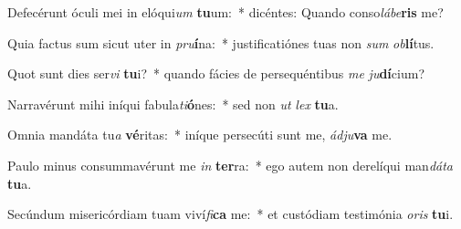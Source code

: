 \item Defecérunt óculi mei in elóqui\textit{um} \textbf{tu}um:~* dicéntes: Quando conso\textit{lá}\textit{be}\textbf{ris} me?
\item Quia factus sum sicut uter in \textit{pru}\textbf{í}na:~* justificatiónes tuas non \textit{sum} \textit{ob}\textbf{lí}tus.
\item Quot sunt dies ser\textit{vi} \textbf{tu}i?~* quando fácies de persequéntibus \textit{me} \textit{ju}\textbf{dí}cium?
\item Narravérunt mihi iníqui fabula\textit{ti}\textbf{ó}nes:~* sed non \textit{ut} \textit{lex} \textbf{tu}a.
\item Omnia mandáta tu\textit{a} \textbf{vé}ritas:~* iníque persecúti sunt me, \textit{ád}\textit{ju}\textbf{va} me.
\item Paulo minus consummavérunt me \textit{in} \textbf{ter}ra:~* ego autem non derelíqui man\textit{dá}\textit{ta} \textbf{tu}a.
\item Secúndum misericórdiam tuam viví\textit{fi}\textbf{ca} me:~* et custódiam testimónia \textit{o}\textit{ris} \textbf{tu}i.
